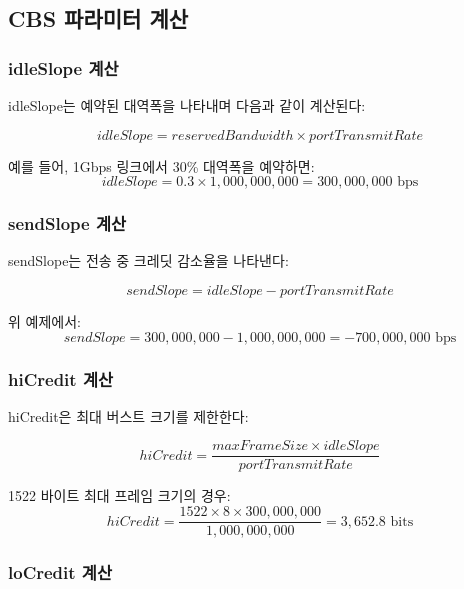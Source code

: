 \documentclass[twocolumn,10pt]{article}
\begin{document}
\subsection{CBS 파라미터 계산}

\subsubsection{idleSlope 계산}

idleSlope는 예약된 대역폭을 나타내며 다음과 같이 계산된다:

\begin{equation}
idleSlope = reservedBandwidth \times portTransmitRate
\end{equation}

예를 들어, 1Gbps 링크에서 30\% 대역폭을 예약하면:
\begin{equation}
idleSlope = 0.3 \times 1,000,000,000 = 300,000,000 \text{ bps}
\end{equation}

\subsubsection{sendSlope 계산}

sendSlope는 전송 중 크레딧 감소율을 나타낸다:

\begin{equation}
sendSlope = idleSlope - portTransmitRate
\end{equation}

위 예제에서:
\begin{equation}
sendSlope = 300,000,000 - 1,000,000,000 = -700,000,000 \text{ bps}
\end{equation}

\subsubsection{hiCredit 계산}

hiCredit은 최대 버스트 크기를 제한한다:

\begin{equation}
hiCredit = \frac{maxFrameSize \times idleSlope}{portTransmitRate}
\end{equation}

1522 바이트 최대 프레임 크기의 경우:
\begin{equation}
hiCredit = \frac{1522 \times 8 \times 300,000,000}{1,000,000,000} = 3,652.8 \text{ bits}
\end{equation}

\subsubsection{loCredit 계산}
\end{document}
